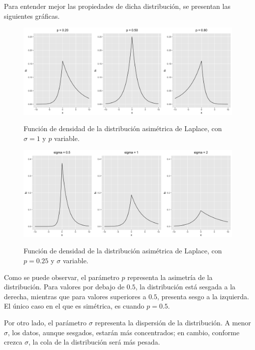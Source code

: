 Para entender mejor las propiedades de dicha distribuci\'on, se presentan las siguientes gr\'aficas.

\begin{figure}[H]
	\centering
	\caption{Funci\'on de densidad de la distribuci\'on asim\'etrica de Laplace, con $\sigma = 1$ y $p$ variable.}
	\includegraphics[width=1\textwidth]{Figures/ALD/p_plots.png}
	\label{p_plots}
\end{figure}

\begin{figure}[H]
	\centering
	\caption{Funci\'on de densidad de la distribuci\'on asim\'etrica de Laplace, con $p = 0.25$ y $\sigma$ variable.}
	\includegraphics[width=1\textwidth]{Figures/ALD/sigma_plots.png}
	\label{p_plots}
\end{figure}

Como se puede observar, el par\'ametro $p$ representa la asimetr\'ia de la distribuci\'on. Para valores por debajo de $0.5$, la distribuci\'on est\'a sesgada a la derecha, mientras que para valores superiores a $0.5$, presenta sesgo a la izquierda. El \'unico caso en el que es sim\'etrica, es cuando $p = 0.5$. 

Por otro lado, el par\'ametro $\sigma$ representa la dispersi\'on de la distribuci\'on. A menor $\sigma$, los datos, aunque sesgados, estar\'an m\'as concentrados; en cambio, conforme crezca $\sigma$, la cola de la distribuci\'on ser\'a m\'as pesada.

